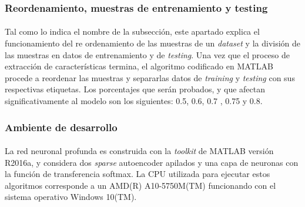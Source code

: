 \documentclass[12pt]{article}%
\begin{document}
\subsubsection{Reordenamiento, muestras de entrenamiento y testing}
\paragraph{}
Tal como lo indica el nombre de la subsección, este apartado explica el funcionamiento del re ordenamiento de las muestras de un \textit{dataset} y la división de las muestras en datos de entrenamiento y de \textit{testing}. Una vez que el proceso de extracción de características termina, el algoritmo codificado en MATLAB procede a reordenar las muestras y separarlas datos de \textit{training} y \textit{testing} con sus respectivas etiquetas. Los porcentajes que serán probados, y que afectan significativamente al modelo son los siguientes: 0.5, 0.6, 0.7 , 0.75 y 0.8.

\subsubsection{Ambiente de desarrollo}
\paragraph{}
La red neuronal profunda es construida con la \textit{toolkit} de MATLAB versión R2016a, y considera dos \textit{sparse} autoencoder apilados y una capa de neuronas con la función de transferencia softmax. La CPU utilizada para ejecutar estos algoritmos corresponde a un AMD(R) A10-5750M(TM) funcionando con el sistema operativo Windows 10(TM). 
\end{document}
